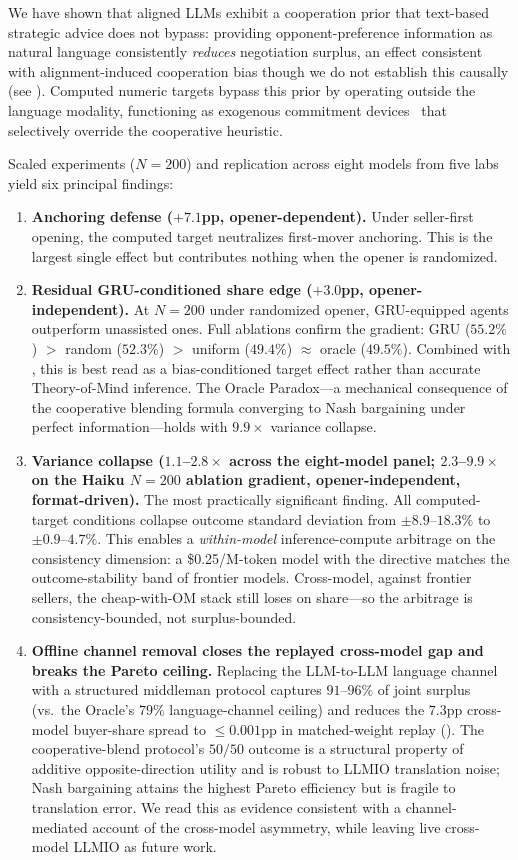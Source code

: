 \documentclass[11pt,a4paper]{article}
\begin{document}
We have shown that aligned LLMs exhibit a cooperation prior that text-based strategic advice does not bypass: providing opponent-preference information as natural language consistently \emph{reduces} negotiation surplus, an effect consistent with alignment-induced cooperation bias though we do not establish this causally (see ). Computed numeric targets bypass this prior by operating outside the language modality, functioning as exogenous commitment devices~\citep{schelling1960strategy} that selectively override the cooperative heuristic.

Scaled experiments ($N = 200$) and replication across eight models from five labs yield six principal findings:

\begin{enumerate}
\item \textbf{Anchoring defense ($+7.1$pp, opener-dependent).} Under seller-first opening, the computed target neutralizes first-mover anchoring. This is the largest single effect but contributes nothing when the opener is randomized.
\item \textbf{Residual GRU-conditioned share edge ($+3.0$pp, opener-independent).} At $N = 200$ under randomized opener, GRU-equipped agents outperform unassisted ones. Full ablations confirm the gradient: GRU ($55.2\%$) $>$ random ($52.3\%$) $>$ uniform ($49.4\%$) $\approx$ oracle ($49.5\%$). Combined with , this is best read as a bias-conditioned target effect rather than accurate Theory-of-Mind inference. The Oracle Paradox---a mechanical consequence of the cooperative blending formula converging to Nash bargaining under perfect information---holds with $9.9\times$ variance collapse.
\item \textbf{Variance collapse ($1.1$--$2.8\times$ across the eight-model panel; $2.3$--$9.9\times$ on the Haiku $N\!=\!200$ ablation gradient, opener-independent, format-driven).} The most practically significant finding. All computed-target conditions collapse outcome standard deviation from $\pm 8.9$--$18.3\%$ to $\pm 0.9$--$4.7\%$. This enables a \emph{within-model} inference-compute arbitrage on the consistency dimension: a \$0.25/M-token model with the directive matches the outcome-stability band of frontier models. Cross-model, against frontier sellers, the cheap-with-OM stack still loses on share---so the arbitrage is consistency-bounded, not surplus-bounded.
\item \textbf{Offline channel removal closes the replayed cross-model gap and breaks the Pareto ceiling.} Replacing the LLM-to-LLM language channel with a structured middleman protocol captures $91$--$96\%$ of joint surplus (vs.\ the Oracle's $79\%$ language-channel ceiling) and reduces the $7.3$pp cross-model buyer-share spread to $\le 0.001$pp in matched-weight replay (). The cooperative-blend protocol's $50/50$ outcome is a structural property of additive opposite-direction utility and is robust to LLMIO translation noise; Nash bargaining attains the highest Pareto efficiency but is fragile to translation error. We read this as evidence consistent with a channel-mediated account of the cross-model asymmetry, while leaving live cross-model LLMIO as future work.

\end{enumerate}
\end{document}
